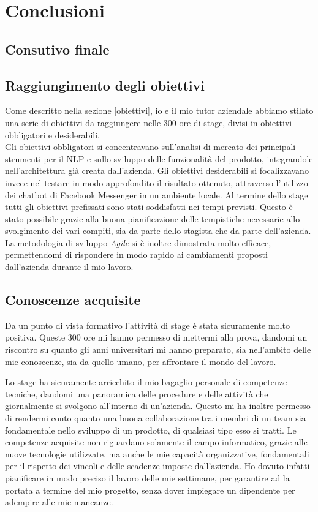 
\chapter{Conclusioni}
\label{cap:conclusioni}

\section{Consutivo finale}


\section{Raggiungimento degli obiettivi}
Come descritto nella sezione \ref{obiettivi}, io e il mio tutor aziendale abbiamo stilato una serie di obiettivi da raggiungere nelle 300 ore di stage, divisi in obiettivi obbligatori e desiderabili. \\ 
Gli obiettivi obbligatori si concentravano sull'analisi di mercato dei principali strumenti per il \gls{NLP} e sullo sviluppo delle funzionalità del prodotto, integrandole nell'architettura già creata dall'azienda. Gli obiettivi desiderabili si focalizzavano invece nel testare in modo approfondito il risultato ottenuto, attraverso l'utilizzo dei \gls{chatbot} di Facebook Messenger in un ambiente locale. 
Al termine dello stage tutti gli obiettivi prefissati sono stati soddisfatti nei tempi previsti. Questo è stato possibile grazie alla buona pianificazione delle tempistiche necessarie allo svolgimento dei vari compiti, sia da parte dello stagista che da parte dell'azienda. La metodologia di sviluppo \emph{Agile} si è inoltre dimostrata molto efficace, permettendomi di rispondere in modo rapido ai cambiamenti proposti dall'azienda durante il mio lavoro. 
\section{Conoscenze acquisite}
Da un punto di vista formativo l'attività di stage è stata sicuramente molto positiva. Queste 300 ore mi hanno permesso di mettermi alla prova, dandomi un riscontro su quanto gli anni universitari mi hanno preparato, sia nell'ambito delle mie conoscenze, sia da quello umano, per affrontare il mondo del lavoro.


Lo stage ha sicuramente arricchito il mio bagaglio personale di competenze tecniche, dandomi una panoramica delle procedure e delle attività che giornalmente si svolgono all'interno di un'azienda. Questo mi ha inoltre permesso di rendermi conto quanto una buona collaborazione tra i membri di un team sia fondamentale nello sviluppo di un prodotto, di qualsiasi tipo esso si tratti.
Le competenze acquisite non riguardano solamente il campo informatico, grazie alle nuove tecnologie utilizzate, ma anche le mie capacità organizzative, fondamentali per il rispetto dei vincoli e delle scadenze imposte dall'azienda. Ho dovuto infatti pianificare in modo preciso il lavoro delle mie settimane, per garantire ad \azienda{} la portata a termine del mio progetto, senza dover impiegare un dipendente per adempire alle mie mancanze. 

